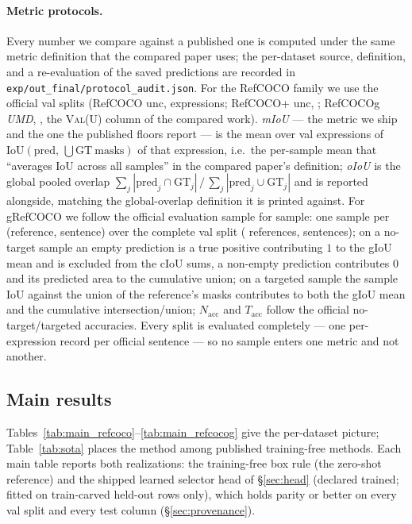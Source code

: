 \paragraph{Metric protocols.}
\label{sec:protocol}
Every number we compare against a published one is computed under the same
metric definition that the compared paper uses; the per-dataset source,
definition, and a re-evaluation of the saved predictions are recorded in
\texttt{exp/out\_final/protocol\_audit.json}. For the RefCOCO family we use
the official val splits (RefCOCO unc,  expressions; RefCOCO+ unc,
; RefCOCOg \emph{UMD}, , the \textsc{Val(U)} column
of the compared work). \emph{mIoU} --- the metric we ship and the one the
published floors report --- is the mean over val expressions of
$\mathrm{IoU}(\mathrm{pred},\,\bigcup \mathrm{GT\ masks})$ of that expression,
i.e.\ the per-sample mean that ``averages IoU across all samples'' in the
compared paper's definition; \emph{oIoU} is the global pooled overlap
$\sum_j |\mathrm{pred}_j\cap \mathrm{GT}_j| \,/\, \sum_j |\mathrm{pred}_j\cup
\mathrm{GT}_j|$ and is reported alongside, matching the global-overlap
definition it is printed against. For gRefCOCO we follow the official
evaluation sample for sample: one sample per (reference, sentence) over the
complete val split (\nGres{} references, \grefN{} sentences); on a no-target
sample an empty prediction is a true positive contributing $1$ to the gIoU
mean and is excluded from the cIoU sums, a non-empty prediction contributes
$0$ and its predicted area to the cumulative union; on a targeted sample the
sample IoU against the union of the reference's masks contributes to both the
gIoU mean and the cumulative intersection/union; $N_{\mathrm{acc}}$ and
$T_{\mathrm{acc}}$ follow the official no-target/targeted accuracies. Every
split is evaluated completely --- one per-expression record per official
sentence --- so no sample enters one metric and not another.

\subsection{Main results}
Tables~\ref{tab:main_refcoco}--\ref{tab:main_refcocog} give the per-dataset
picture; Table~\ref{tab:sota} places the method among published training-free
methods. Each main table reports both realizations: the training-free box rule
(the zero-shot reference) and the shipped learned selector head of
\S\ref{sec:head} (declared trained; fitted on train-carved held-out rows only),
which holds parity or better on every val split and every test column
(\S\ref{sec:provenance}).

